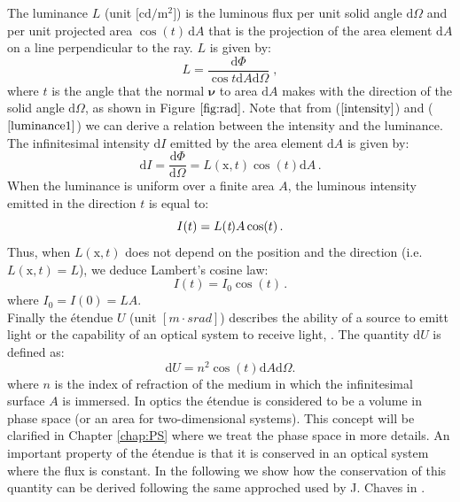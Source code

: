 The luminance $L$ \big(unit $\big[\textrm{cd} / \textrm{m}^2\big]$\big) is the luminous flux per unit solid angle $\textrm{d}\Omega$ and  per unit projected area $\cos(t)\,\textrm{d}A$ that is the projection of the area element $\textrm{d}A$ on a line perpendicular to the ray.  $L$  is given by:
\begin{equation}\label{luminance1}
  L=\frac{\textrm{d}\Phi}{\cos t\textrm{d}A\textrm{d}\Omega}\;,
\end{equation}
where $t$ is the angle that the normal $\boldsymbol{\nu}$ to area $\textrm{d}A$ makes with the direction of the solid angle $\textrm{d}\Omega$, as shown in Figure $\ref{fig:rad}$.
\noindent Note that from ($\ref{intensity}$) and ($\ref{luminance1}$) we can derive a relation between the intensity and the luminance.\\
The infinitesimal intensity $\textrm{d}I $ emitted by the area element $\textrm{d}A$ is given by:
\begin{equation}
\textrm{d}I = \frac{\textrm{d}\Phi}{\textrm{d}\Omega}= L(\textrm{x},t)\cos(t)\textrm{d}A \,.
\end{equation}
When the luminance is uniform over a finite area $A$, the luminous intensity emitted in the direction $t$ is equal to:
\begin{equation}
I(t) = L(\textit{t}) A \cos(t)\,.
\end{equation}
Thus, when $L(\textrm{x},t)$ does not depend on the position and the direction (i.e. $L(\textrm{x},t)=L$), we deduce Lambert's cosine law:
\begin{equation}
I(t) = I_0\cos(t)\,.
\end{equation}
where $I_0 = I(0) = LA$. \\
Finally the \'{e}tendue $U$ (unit $[m \cdot srad]$) describes the ability of a source to emitt light or the capability of an optical system to receive light, \cite{zhu2011etendue}.
The quantity $ \textrm{d}U $ is defined as:
\begin{equation}\label{etendue}
\textrm{d}U = n^2 \cos(t) \textrm{d}A\textrm{d}\Omega.
\end{equation}
where $n$ is the index of refraction of the medium in which the infinitesimal surface $A$ is immersed. In optics the \'{e}tendue is considered to be a volume in phase space  (or an area for two-dimensional systems). This concept will be clarified in Chapter \ref{chap:PS} where we treat the phase space in more details.
An important property of the \'{e}tendue is that it is conserved in an optical system where the flux is constant. In the following we show how the conservation of this quantity can be derived following the same approched used by J. Chaves in \cite{chaves2015introduction}.
